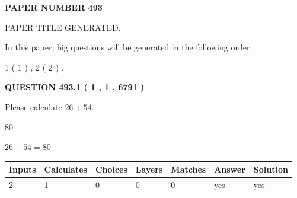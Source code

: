 \documentclass[12pt]{article}
\begin{document}
   
 {\textbf{ \Large{ PAPER NUMBER  493  }}}
   
   
\vspace{0.2in}
   
   
   
   
   
   
   
   
 \vspace{0.2in}
 
 
 
 
   
   
 PAPER TITLE GENERATED.
   
   
   
\vspace{0.2in}
   
In this paper, big questions will be generated in the following order: 
   
   
   1 ( 1 )
 ,
   2 ( 2 )
 .
  
\vspace{0.2in}
  
{\textbf{\Large{QUESTION
493.1 
 ( 1 , 1 , 6791 )
}}}
  
  
 
Please calculate $ %
26 +  %
54 $.
 
 
 
\noindent{}
 
 

80
 
 
\noindent{}
 
 

 
 
 
\noindent{}
 
 

$ %
26 +  %
54=   %
80$
 
 
\noindent{}
 
 

 
   
   
   
   
\noindent\begin{tabular}{|l|l|l|l|l|l|l|}
 \hline
Inputs & Calculates & Choices & Layers & Matches & Answer & Solution \\ \hline
 2  & 
 1  & 
 0
  & 
 0  & 
 0  & 
  yes & 
  yes 
  \\ \hline
 \end{tabular}
   
\end{document}
